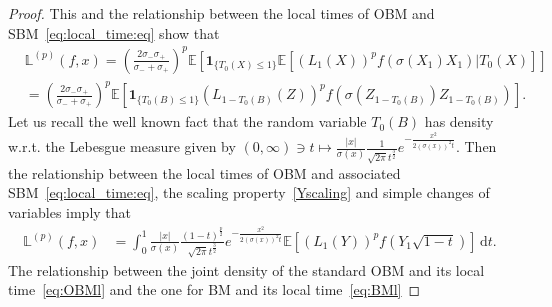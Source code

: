 \documentclass[12pt]{article}
\numberwithin{equation}{section}
\theoremstyle{definition}
\theoremstyle{remark}
\newcommand{\EE}{\mathbb{E}}
\newcommand{\ind}[1]{\mathbf{1}_{#1}}
\newcommand{\vd}{\,\mathrm{d}}
\newcommand{\Lm}[3]{\mathbb{L}^{(#2)}(#1,#3)}
\begin{document}
\begin{proof}
This and the relationship between the local times of OBM and SBM~\eqref{eq:local_time:eq} show that
\begin{equation}\begin{split}
	& \Lm{f}{p}{x} 
	= \left(\tfrac{2 \sigma_-\sigma_+}{\sigma_-+\sigma_+}\right)^p 
		\EE\!\left[ \ind{\{T_0\left(X\right)\leq 1\}} \EE\!\left[  \left( L_1(X)\right)^p f(\sigma(X_1)X_1) | T_0(X)\right] \right]
	\\
	& = \left(\tfrac{2 \sigma_-\sigma_+}{\sigma_-+\sigma_+}\right)^p 
		\EE\!\left[ \ind{\{T_0\left(B\right) \leq 1\}} \left( L_{1-T_0\left(B\right)}(Z)\right)^p f(\sigma(Z_{1-T_0\left(B\right)}) Z_{1-T_0\left(B\right)}) \right]\!.
\end{split}\end{equation}
Let us recall the well known fact that the random variable $T_0(B)$ has density w.r.t. the Lebesgue measure given by
$
	(0,\infty) \ni t\mapsto \frac{|x|}{\sigma(x)} \frac{1}{\sqrt{2\pi} t^\frac32} e^{-\frac{x^2}{2 (\sigma(x))^2 t}}.
$
Then the relationship between the local times of OBM and associated SBM~\eqref{eq:local_time:eq},
the scaling property~\eqref{Yscaling} and simple changes of variables 
imply that
\begin{equation}\begin{split}
	\Lm{f}{p}{x} 
& =	\int_0^1 \frac{|x|}{\sigma(x)} \frac{(1-t)^\frac{p}{2}}{\sqrt{2\pi} t^\frac32} e^{-\frac{x^2}{2 (\sigma(x))^2 t}} \EE\!\left[ \left( L_1(Y)\right)^p f(Y_1 \sqrt{1-t})\right] \! \vd t.
\end{split}\end{equation}
The relationship between the joint density of the standard OBM and its local time~\eqref{eq:OBMl} and the one for BM and its local time~\eqref{eq:BMl} 

\end{proof}
\end{document}
